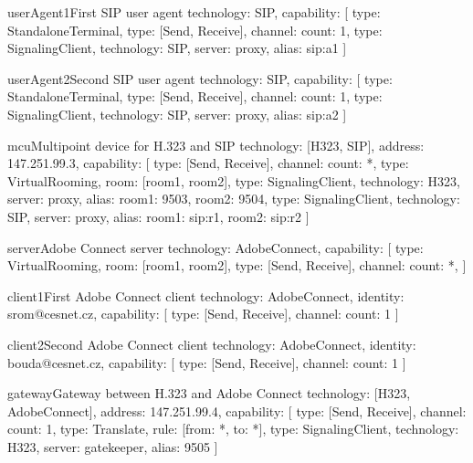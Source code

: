 \documentclass[a4paper]{report}
\begin{document}
\begin{TopologyExample}{userAgent1}{First SIP user agent}
technology: SIP,
capability: [
  {type: StandaloneTerminal}, {type: [Send, Receive], channel: {count: 1}}, 
  {type: SignalingClient, technology: SIP, server: proxy, alias: sip:a1}
]
\end{TopologyExample}

\begin{TopologyExample}{userAgent2}{Second SIP user agent}
technology: SIP,
capability: [
  {type: StandaloneTerminal}, {type: [Send, Receive], channel: {count: 1}}, 
  {type: SignalingClient, technology: SIP, server: proxy, alias: sip:a2}
]
\end{TopologyExample}

\begin{TopologyExample}{mcu}{Multipoint device for H.323 and SIP}
technology: [H323, SIP], address: 147.251.99.3,
capability: [
  {type: [Send, Receive], channel: {count: *}}, 
  {type: VirtualRooming, room: [room1, room2]},
  {type: SignalingClient, technology: H323, server: proxy, 
     alias: {room1: 9503, room2: 9504}},
  {type: SignalingClient, technology: SIP, server: proxy, 
     alias: {room1: sip:r1, room2: sip:r2}}
]
\end{TopologyExample}

\begin{TopologyExample}{server}{Adobe Connect server}
technology: AdobeConnect,
capability: [
  {type: VirtualRooming, room: [room1, room2]}, 
  {type: [Send, Receive], channel: {count: *}}, 
]
\end{TopologyExample}

\begin{TopologyExample}{client1}{First Adobe Connect client}
technology: AdobeConnect, identity: srom@cesnet.cz,
capability: [
  {type: [Send, Receive], channel: {count: 1}}
]
\end{TopologyExample}

\begin{TopologyExample}{client2}{Second Adobe Connect client}
technology: AdobeConnect, identity: bouda@cesnet.cz,
capability: [
  {type: [Send, Receive], channel: {count: 1}}
]
\end{TopologyExample}

\begin{TopologyExample}{gateway}{Gateway between H.323 and Adobe Connect}
technology: [H323, AdobeConnect], address: 147.251.99.4,
capability: [
  {type: [Send, Receive], channel: {count: 1}},
  {type: Translate, rule: [{from: *, to: *}]},
  {type: SignalingClient, technology: H323, server: gatekeeper, alias: 9505}
]
\end{TopologyExample}
\end{document}
